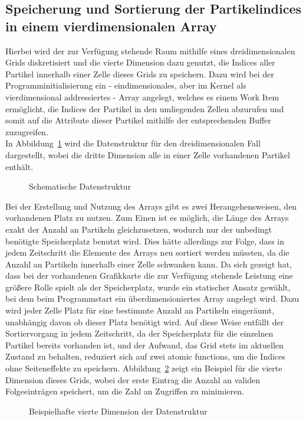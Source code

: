 \subsection{Speicherung und Sortierung der Partikelindices in einem vierdimensionalen Array}
Hierbei wird der zur Verfügung stehende Raum mithilfe eines dreidimensionalen Grids diskretisiert und die vierte Dimension dazu genutzt, die Indices aller Partikel innerhalb einer Zelle dieses Grids zu speichern. Dazu wird bei der Programminitialisierung ein - eindimensionales, aber im Kernel als vierdimensional addressiertes - Array angelegt, welches es einem Work Item ermöglicht, die Indices der Partikel in den umliegenden Zellen abzurufen und somit auf die Attribute dieser Partikel mithilfe der entsprechenden Buffer zuzugreifen.\\
In Abbildung~\ref{fig:datenstruktur_grid} wird die Datenstruktur für den dreidimensionalen Fall dargestellt, wobei die dritte Dimension alle in einer Zelle vorhandenen Partikel enthält.\\
\begin{figure}
  \centering
    
  \caption{Schematische Datenstruktur}
  \label{fig:datenstruktur_grid}
\end{figure}
Bei der Erstellung und Nutzung des Arrays gibt es zwei Herangehensweisen, den vorhandenen Platz zu nutzen. Zum Einen ist es möglich, die Länge des Arrays exakt der Anzahl an Partikeln gleichzusetzen, wodurch nur der unbedingt benötigte Speicherplatz benutzt wird. Dies hätte allerdings zur Folge, dass in jedem Zeitschritt die Elemente des Arrays neu sortiert werden müssten, da die Anzahl an Partikeln innerhalb einer Zelle schwanken kann. Da sich gezeigt hat, dass bei der vorhandenen Grafikkarte die zur Verfügung stehende Leistung eine größere Rolle spielt als der Speicherplatz, wurde ein statischer Ansatz gewählt, bei dem beim Programmstart ein überdimensioniertes Array angelegt wird. Dazu wird jeder Zelle Platz für eine bestimmte Anzahl an Partikeln eingeräumt, unabhängig davon ob dieser Platz benötigt wird. Auf diese Weise entfällt der Sortiervorgang in jedem Zeitschritt, da der Speicherplatz für die einzelnen Partikel bereits vorhanden ist, und der Aufwand, das Grid stets im aktuellen Zustand zu behalten, reduziert sich auf zwei atomic functions, um die Indices ohne Seiteneffekte zu speichern. Abbildung~\ref{fig:datenstruktur_eintraege} zeigt ein Beispiel für die vierte Dimension dieses Grids, wobei der erste Eintrag die Anzahl an validen Folgeeinträgen speichert, um die Zahl an Zugriffen zu minimieren.
\begin{figure}
  \centering
    
  \caption{Beispielhafte vierte Dimension der Datenstruktur}
  \label{fig:datenstruktur_eintraege}
\end{figure}

